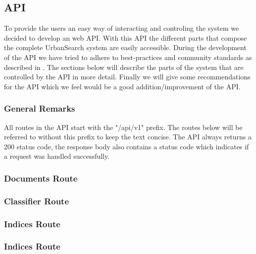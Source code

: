 \subsection{API}
To provide the users an easy way of interacting and controling the system we decided to develop an web API. With this API the different parts that compose the complete UrbanSearch system are easily accessible. During the development of the API we have tried to adhere to best-practices and community standards as described in \cite{apigee}. The sections below will describe the parts of the system that are controlled by the API in more detail. Finally we will give some recommendations for the API which we feel would be a good addition/improvement of the API.

\subsubsection{General Remarks}

All routes in the API start with the "/api/v1" prefix. The routes below will be referred to without this prefix to keep the text concise. The API always returns a 200 status code, the response body also contains a status code which indicates if a request was handled successfully.












\subsubsection{Documents Route}
\subsubsection{Classifier Route}
\subsubsection{Indices Route}
\subsubsection{Indices Route}
